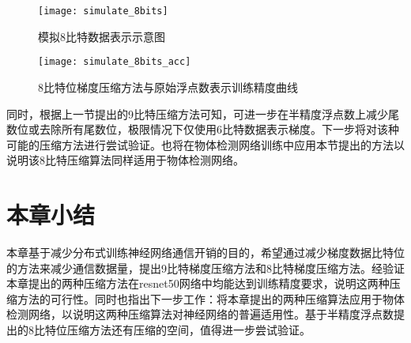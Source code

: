 \begin{figure}[htp]
\centering
\texttt{[image: simulate\_8bits]}
\caption{模拟8比特数据表示示意图}
\label{fig:simulate_8bits}
\end{figure}

\begin{figure}[htp]
\centering
\texttt{[image: simulate\_8bits\_acc]}
\caption{8比特位梯度压缩方法与原始浮点数表示训练精度曲线}
\label{fig:simulate_8bits_acc}
\end{figure}

同时，根据上一节提出的9比特压缩方法可知，可进一步在半精度浮点数上减少尾数位或去除所有尾数位，极限情况下仅使用6比特数据表示梯度。下一步将对该种可能的压缩方法进行尝试验证。也将在物体检测网络训练中应用本节提出的方法以说明该8比特压缩算法同样适用于物体检测网络。

\section{本章小结}
本章基于减少分布式训练神经网络通信开销的目的，希望通过减少梯度数据比特位的方法来减少通信数据量，提出9比特梯度压缩方法和8比特梯度压缩方法。经验证本章提出的两种压缩方法在resnet50网络中均能达到训练精度要求，说明这两种压缩方法的可行性。同时也指出下一步工作：将本章提出的两种压缩算法应用于物体检测网络，以说明这两种压缩算法对神经网络的普遍适用性。基于半精度浮点数提出的8比特位压缩方法还有压缩的空间，值得进一步尝试验证。







